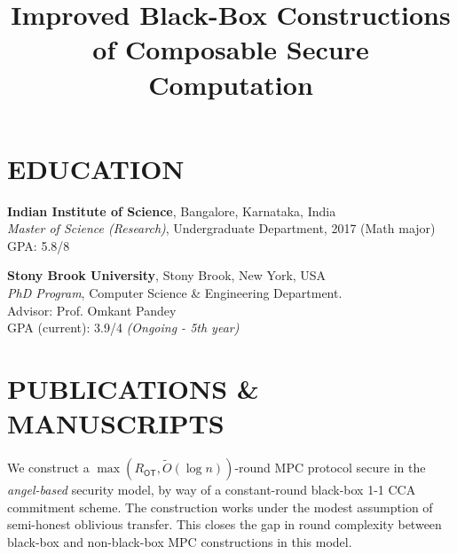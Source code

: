\documentclass[margin]{res}
\begin{document}
\begin{resume}

\section{EDUCATION}
\textbf{Indian Institute of Science}, Bangalore, Karnataka, India\\
{\sl Master of Science (Research)}, Undergraduate Department, 2017 (Math major)\hfill \newline
GPA: 5.8/8

\textbf{Stony Brook University}, Stony Brook, New York, USA\\
{\sl PhD Program}, Computer Science \& Engineering Department. \\ Advisor: Prof. Omkant Pandey \\ GPA (current): 3.9/4
\textit{(Ongoing - 5th year)}


\section{PUBLICATIONS \& MANUSCRIPTS}

\location{}
\title{\textbf{Improved Black-Box Constructions of Composable Secure Computation}}
\begin{position}
We construct a $\max(R_\mathsf{OT},\widetilde{O}(\log n))$-round  MPC protocol secure in the {\em angel-based} security model, by way of a constant-round black-box 1-1 CCA commitment scheme. The construction works under the modest assumption of semi-honest oblivious transfer. This closes the gap in round complexity between black-box and non-black-box MPC constructions in this model. 
\end{position}


\end{resume}
\end{document}
